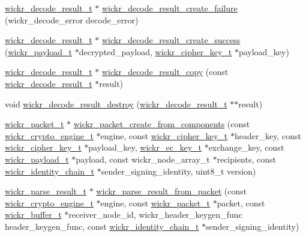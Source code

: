 \begin{DoxyCompactItemize}
\item 
\mbox{\hyperlink{structwickr__decode__result}{wickr\+\_\+decode\+\_\+result\+\_\+t}} $\ast$ \mbox{\hyperlink{group__wickr__protocol_ga2bd6f49ed993d2290aaafa514eba43ed}{wickr\+\_\+decode\+\_\+result\+\_\+create\+\_\+failure}} (wickr\+\_\+decode\+\_\+error decode\+\_\+error)
\item 
\mbox{\hyperlink{structwickr__decode__result}{wickr\+\_\+decode\+\_\+result\+\_\+t}} $\ast$ \mbox{\hyperlink{group__wickr__protocol_ga633aaf4cb6159be0110401f06dae458c}{wickr\+\_\+decode\+\_\+result\+\_\+create\+\_\+success}} (\mbox{\hyperlink{structwickr__payload}{wickr\+\_\+payload\+\_\+t}} $\ast$decrypted\+\_\+payload, \mbox{\hyperlink{structwickr__cipher__key}{wickr\+\_\+cipher\+\_\+key\+\_\+t}} $\ast$payload\+\_\+key)
\item 
\mbox{\hyperlink{structwickr__decode__result}{wickr\+\_\+decode\+\_\+result\+\_\+t}} $\ast$ \mbox{\hyperlink{group__wickr__protocol_ga36183bf96372661f890aefbe388bd32a}{wickr\+\_\+decode\+\_\+result\+\_\+copy}} (const \mbox{\hyperlink{structwickr__decode__result}{wickr\+\_\+decode\+\_\+result\+\_\+t}} $\ast$result)
\item 
void \mbox{\hyperlink{group__wickr__protocol_ga94154ab44a6c2e9b97a115e37416efe1}{wickr\+\_\+decode\+\_\+result\+\_\+destroy}} (\mbox{\hyperlink{structwickr__decode__result}{wickr\+\_\+decode\+\_\+result\+\_\+t}} $\ast$$\ast$result)
\item 
\mbox{\hyperlink{structwickr__packet}{wickr\+\_\+packet\+\_\+t}} $\ast$ \mbox{\hyperlink{group__wickr__protocol_gaf34d8082df52a7ade2fea54eea65d342}{wickr\+\_\+packet\+\_\+create\+\_\+from\+\_\+components}} (const \mbox{\hyperlink{structwickr__crypto__engine}{wickr\+\_\+crypto\+\_\+engine\+\_\+t}} $\ast$engine, const \mbox{\hyperlink{structwickr__cipher__key}{wickr\+\_\+cipher\+\_\+key\+\_\+t}} $\ast$header\+\_\+key, const \mbox{\hyperlink{structwickr__cipher__key}{wickr\+\_\+cipher\+\_\+key\+\_\+t}} $\ast$payload\+\_\+key, \mbox{\hyperlink{structwickr__ec__key}{wickr\+\_\+ec\+\_\+key\+\_\+t}} $\ast$exchange\+\_\+key, const \mbox{\hyperlink{structwickr__payload}{wickr\+\_\+payload\+\_\+t}} $\ast$payload, const wickr\+\_\+node\+\_\+array\+\_\+t $\ast$recipients, const \mbox{\hyperlink{structwickr__identity__chain}{wickr\+\_\+identity\+\_\+chain\+\_\+t}} $\ast$sender\+\_\+signing\+\_\+identity, uint8\+\_\+t version)
\item 
\mbox{\hyperlink{structwickr__parse__result}{wickr\+\_\+parse\+\_\+result\+\_\+t}} $\ast$ \mbox{\hyperlink{group__wickr__protocol_ga1654ef299f9189b27e5e58485f1ffcf5}{wickr\+\_\+parse\+\_\+result\+\_\+from\+\_\+packet}} (const \mbox{\hyperlink{structwickr__crypto__engine}{wickr\+\_\+crypto\+\_\+engine\+\_\+t}} $\ast$engine, const \mbox{\hyperlink{structwickr__packet}{wickr\+\_\+packet\+\_\+t}} $\ast$packet, const \mbox{\hyperlink{structwickr__buffer}{wickr\+\_\+buffer\+\_\+t}} $\ast$receiver\+\_\+node\+\_\+id, wickr\+\_\+header\+\_\+keygen\+\_\+func header\+\_\+keygen\+\_\+func, const \mbox{\hyperlink{structwickr__identity__chain}{wickr\+\_\+identity\+\_\+chain\+\_\+t}} $\ast$sender\+\_\+signing\+\_\+identity)
$$
\end{DoxyCompactItemize}
